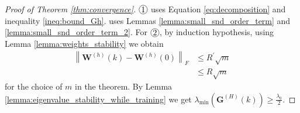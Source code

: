 \documentclass[11pt]{article}
\theoremstyle{plain}
\theoremstyle{definition}
\begin{document}
\begin{proof}[Proof of Theorem \ref{thm:convergence}]
$\circled{1}$ uses Equation \eqref{eq:decomposition} and inequality \eqref{ineq:bound_Gh}.  uses Lemmas \ref{lemma:small_snd_order_term} and \ref{lemma:small_snd_order_term_2}. For $\circled{2}$, by induction hypothesis, using Lemma \ref{lemma:weights_stability} we obtain
\[
\begin{aligned}\left\|\mathbf{W}^{(h)}(k)-\mathbf{W}^{(h)}(0)\right\|_{F} & \leq R^{\prime} \sqrt{m} \\ & \leq R \sqrt{m} \end{aligned}
\]
for the choice of $m$ in the theorem. By Lemma \ref{lemma:eigenvalue_stability_while_training} we get $\lambda_{\min }\left(\mathbf{G}^{(H)}(k)\right) \geq \frac{\lambda_{0}}{2}$.


\end{proof}


\nocite{*}                 %
\end{document}

